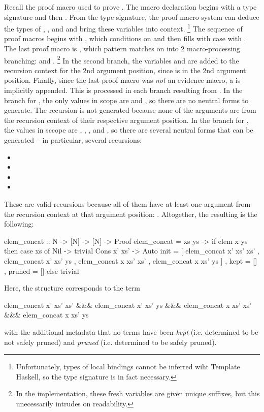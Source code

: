 Recall the proof macro used to prove .
The macro declaration begins with a type signature and then .
From the type signature, the proof macro system can deduce the types of , , and  and bring these variables into context.
\footnote{Unfortunately, types of local bindings cannot be inferred wiht Template Haskell, so the type signature is in fact necessary.}
The sequence of proof macros begins with , which conditions on  and then fills with  case with .
The last proof macro is , which pattern matches on  into 2 macro-processing branching: \LC{[]} and .
\footnote{In the implementation, these fresh variables are given unique suffixes, but this unecessarily intrudes on readability.}
In the second branch, the variables  and  are added to the recursion context for the 2nd argument position, since  is in the 2nd argument position.
Finally, since the last proof macro was \textit{not} an evidence macro, a  is implicitly appended.
This  is processed in each branch resulting from .
In the branch for \LC{[]}, the only values in scope are  and , so there are no neutral forms to generate.
The recursion  is not generated because none of the arguments are from the recursion context of their respective argument position.
In the branch for \LC{[]}, the values in sccope are , , , and , so there are several neutral forms that can be generated -- in particular, several recursions:
\begin{itemize}
  \item {}
  \item {}
  \item {}
  \item {}
\end{itemize}
These are valid recursions because all of them have at least one argument from the recursion context at that argument position: .
Altogether, the resulting \LangBTerm is the following:
\begin{code}
  elem_concat :: N -> [N] -> [N] -> Proof
  elem_concat = \x xs ys ->
    if elem x ys then
      case xs of
        Nil -> trivial
        Cons x' xs' -> Auto
          { init = [ elem_concat x' xs' xs' 
                   , elem_concat x' xs' ys
                   , elem_concat x  xs' xs'
                   , elem_concat x  xs' ys ]
          , kept = []
          , pruned = [] }
    else
      trivial
\end{code}
Here, the  structure corresponds to the term
\begin{code}
  elem_concat x' xs' xs' &&&
  elem_concat x' xs' ys  &&&
  elem_concat x  xs' xs' &&&
  elem_concat x  xs' ys
\end{code}
with the additional metadata that no terms have been \textit{kept} (i.e. determined to be not safely pruned) and \textit{pruned} (i.e. determined to be safely pruned).

